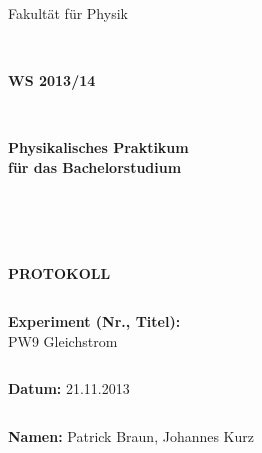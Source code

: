 \documentclass[12pt,a4paper]{article}
\begin{document}
\thispagestyle{empty}
			\begin{center}
			\Large{Fakultät für Physik}\\
			\end{center}
\begin{verbatim}


\end{verbatim}
			\begin{center}
			\textbf{\LARGE WS 2013/14}
			\end{center}
\begin{verbatim}


\end{verbatim}
			\begin{center}
			\textbf{\LARGE{Physikalisches Praktikum\\ für das Bachelorstudium}}
			\end{center}
\begin{verbatim}




\end{verbatim}

			\begin{center}
			\textbf{\LARGE{PROTOKOLL}}
			\end{center}
			
\begin{verbatim}

\end{verbatim}

			\begin{flushleft}
			\textbf{\Large{Experiment (Nr., Titel):}}\\
			\LARGE{PW9 Gleichstrom}	
			\end{flushleft}

\begin{verbatim}

\end{verbatim}	
			\begin{flushleft}
			\textbf{\Large{Datum:}} \Large{21.11.2013}
			\end{flushleft}
			
\begin{verbatim}
\end{verbatim}
		\begin{flushleft}
			\textbf{\Large{Namen:}} \Large{Patrick Braun, Johannes Kurz}
			\end{flushleft}
\end{document}
